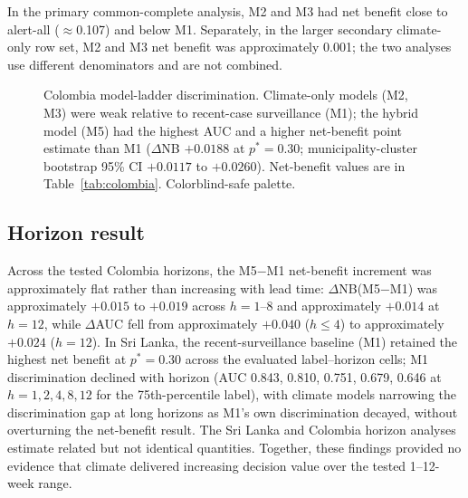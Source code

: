 \documentclass[11pt,a4paper]{article}
\begin{document}
\noindent In the primary common-complete analysis, M2 and M3 had net benefit close to alert-all ($\approx$0.107) and below M1. Separately, in the larger secondary climate-only row set, M2 and M3 net benefit was approximately 0.001; the two analyses use different denominators and are not combined.

\begin{figure}[htbp]
\centering
{}
\caption{Colombia model-ladder discrimination. Climate-only models (M2, M3) were weak relative to recent-case surveillance (M1); the hybrid model (M5) had the highest AUC and a higher net-benefit point estimate than M1 ($\Delta$NB $+0.0188$ at $p^*=0.30$; municipality-cluster bootstrap 95\% CI $+0.0117$ to $+0.0260$). Net-benefit values are in Table~\ref{tab:colombia}. Colorblind-safe palette.}
\label{fig:colombia}
\end{figure}

\subsection{Horizon result}
Across the tested Colombia horizons, the M5$-$M1 net-benefit increment was approximately flat rather than increasing with lead time: $\Delta$NB(M5$-$M1) was approximately $+0.015$ to $+0.019$ across $h=1$--8 and approximately $+0.014$ at $h=12$, while $\Delta$AUC fell from approximately $+0.040$ ($h\le4$) to approximately $+0.024$ ($h=12$). In Sri Lanka, the recent-surveillance baseline (M1) retained the highest net benefit at $p^*=0.30$ across the evaluated label--horizon cells; M1 discrimination declined with horizon (AUC 0.843, 0.810, 0.751, 0.679, 0.646 at $h=1,2,4,8,12$ for the 75th-percentile label), with climate models narrowing the discrimination gap at long horizons as M1's own discrimination decayed, without overturning the net-benefit result. The Sri Lanka and Colombia horizon analyses estimate related but not identical quantities. Together, these findings provided no evidence that climate delivered increasing decision value over the tested 1--12-week range.
\end{document}
